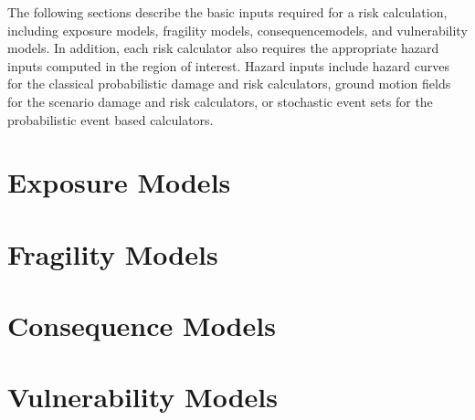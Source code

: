 The following sections describe the basic inputs required for a risk
calculation, including exposure models, fragility models, \glspl{consequencemodel},
and vulnerability models. In addition, each risk calculator also requires the
appropriate hazard inputs computed in the region of interest. Hazard inputs
include hazard curves for the classical probabilistic damage and risk
calculators, ground motion fields for the scenario damage and risk
calculators, or stochastic event sets for the probabilistic event based
calculators.


\section{Exposure Models}
\label{sec:exposure}


\section{Fragility Models}
\label{sec:fragility}


\section{Consequence Models}
\label{sec:consequence}


\section{Vulnerability Models}
\label{sec:vulnerability}

